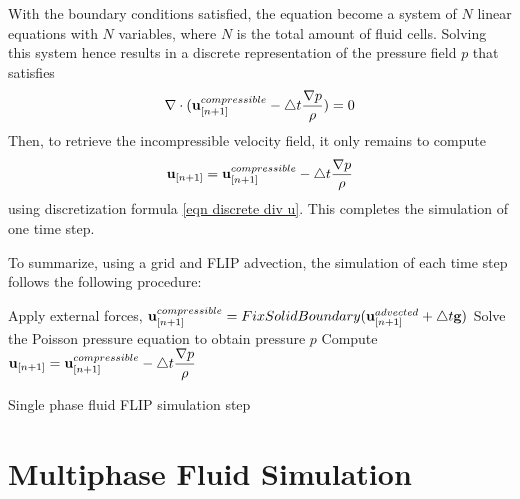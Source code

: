 With the boundary conditions satisfied, the equation become a system of $N$ linear equations with $N$ variables, where $N$ is the total amount of fluid cells. Solving this system hence results in a discrete representation of the pressure field $p$ that satisfies 
$$
\nabla \cdot
 ( \textbf{u}_{[n+1]}^{compressible} - \triangle t \frac{\nabla p}{\rho} ) = 0
$$
Then, to retrieve the incompressible velocity field, it only remains to compute
$$ \textbf{u}_{[n+1]} = \textbf{u}_{[n+1]}^{compressible} - \triangle t \frac{\nabla p}{\rho}$$
using discretization formula \ref{eqn discrete div u}. This completes the simulation of one time step.

\gapM

To summarize, using a grid and FLIP advection, the simulation of each time step follows the following procedure:

\gapM

\begin{algorithm}[H]
    \label{algo singlephase flip}

    \SetAlgoLined
    Apply external forces, $\textbf{u}_{[n+1]}^{compressible} =  FixSolidBoundary(\textbf{u}_{[n+1]}^{advected} + \triangle t \textbf{g})$\;
    Solve the Poisson pressure equation to obtain pressure $p$\;
    Compute $\textbf{u}_{[n+1]} = \textbf{u}_{[n+1]}^{compressible} - \triangle t \dfrac{\nabla p}{\rho}$

    \caption{Single phase fluid FLIP simulation step}
\end{algorithm}


\section{Multiphase Fluid Simulation}
\label{section multiphase FLIP}


